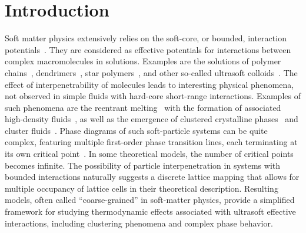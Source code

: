 \documentclass[pdflatex,sn-mathphys-num]{sn-jnl}%
\theoremstyle{thmstyleone}%
\theoremstyle{thmstyletwo}%
\theoremstyle{thmstylethree}%
\begin{document}
	\tableofcontents
	
	\section{Introduction}\label{sec:intro}
	
	Soft matter physics extensively relies on the soft-core, or bounded, interaction potentials~\cite{Likos01}. They are considered as effective potentials for interactions between complex macromolecules in solutions. Examples are the solutions of polymer chains~\cite{LBHM00,BLHM01}, dendrimers~\cite{LSLetal01,MKL08}, star polymers~\cite{LLWetal98}, and other so-called ultrasoft colloids~\cite{Likos06}. The effect of interpenetrability of molecules leads to interesting physical phenomena, not observed in simple fluids with hard-core short-range interactions. Examples of such phenomena are the reentrant melting~\cite{LWL98} with the formation of associated high-density fluids~\cite{LLWL00}, as well as the emergence of clustered crystalline phases~\cite{MGKNL06,MCF07,MKL08} and cluster fluids~\cite{LMLKB10}. Phase diagrams of such soft-particle systems can be quite complex, featuring multiple first-order phase transition lines, each terminating at its own critical point~\cite{NL11, WS13, WS14, Prestipino14, PGT15, dMDM23}. In some theoretical models, the number of critical points becomes infinite. The possibility of particle interpenetration in systems with bounded interactions naturally suggests a discrete lattice mapping that allows for multiple occupancy of lattice cells in their theoretical description.
	Resulting models, often called ``coarse-grained'' in soft-matter physics, provide a simplified framework for studying thermodynamic effects associated with ultrasoft effective interactions, including clustering phenomena and complex phase behavior.
	
\end{document}
